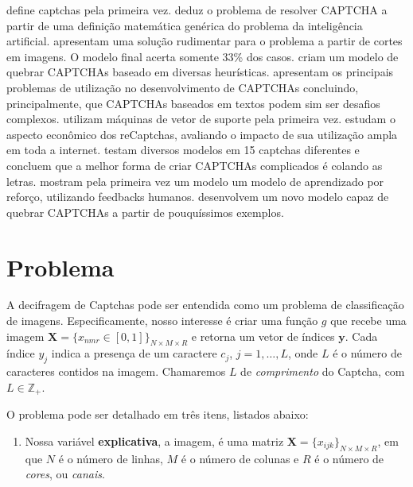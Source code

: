 \documentclass[12pt,]{report}
\providecommand{\tightlist}{%
  \setlength{\itemsep}{0pt}\setlength{\parskip}{0pt}}
\begin{document}
\citep{von2002telling} define captchas pela primeira vez.
\citet{von2003captcha} deduz o problema de resolver CAPTCHA a partir de
uma definição matemática genérica do problema da inteligência
artificial. \citet{mori2003recognizing} apresentam uma solução
rudimentar para o problema a partir de cortes em imagens. O modelo final
acerta somente 33\% dos casos. \citet{yan2008low} criam um modelo de
quebrar CAPTCHAs baseado em diversas heurísticas.
\citet{yan2008usability} apresentam os principais problemas de
utilização no desenvolvimento de CAPTCHAs concluindo, principalmente,
que CAPTCHAs baseados em textos podem sim ser desafios complexos.
\citet{golle2008machine} utilizam máquinas de vetor de suporte pela
primeira vez. \citet{motoyama2010re} estudam o aspecto econômico dos
reCaptchas, avaliando o impacto de sua utilização ampla em toda a
internet. \citet{bursztein2011text} testam diversos modelos em 15
captchas diferentes e concluem que a melhor forma de criar CAPTCHAs
complicados é colando as letras. \citet{bursztein2014end} mostram pela
primeira vez um modelo um modelo de aprendizado por reforço, utilizando
feedbacks humanos. \citet{george2017generative} desenvolvem um novo
modelo capaz de quebrar CAPTCHAs a partir de pouquíssimos exemplos.

\chapter{Problema}\label{problema}

A decifragem de Captchas pode ser entendida como um problema de
classificação de imagens. Especificamente, nosso interesse é criar uma
função \(g\) que recebe uma imagem
\(\mathbf X = \{x_{nmr} \in [0,1]\}_{N\times M \times R}\) e retorna um
vetor de índices \(\mathbf y\). Cada índice \(y_j\) indica a presença de
um caractere \(c_j\), \(j = 1, \dots, L\), onde \(L\) é o número de
caracteres contidos na imagem. Chamaremos \(L\) de \emph{comprimento} do
Captcha, com \(L \in \mathbb{Z}_+\).

O problema pode ser detalhado em três itens, listados abaixo:

\begin{enumerate}
\def\labelenumi{\arabic{enumi}.}
\tightlist
\item
  Nossa variável \textbf{explicativa}, a imagem, é uma matriz
  \(\mathbf X = \{x_{ijk}\}_{N\times M \times R}\), em que \(N\) é o
  número de linhas, \(M\) é o número de colunas e \(R\) é o número de
  \emph{cores}, ou \emph{canais}.
\end{enumerate}
\end{document}
